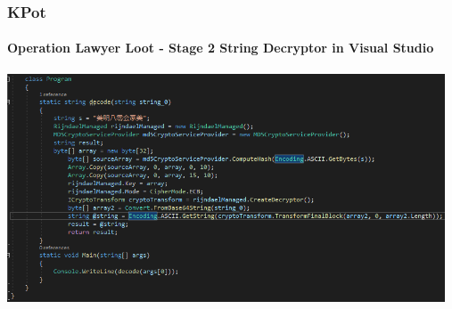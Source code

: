 \documentclass[aspectratio=169]{beamer}
\begin{document}
{
\begin{frame}
  \frametitle{KPot}
  \framesubtitle{Operation Lawyer Loot - Stage 2 String Decryptor in Visual Studio}
  \begin{center}
    \includegraphics[width=13cm]{kpot-unpacking-6}
  \end{center}
\end{frame}
}
\end{document}
